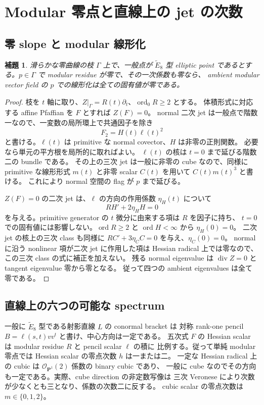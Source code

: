 \documentclass[11pt,a4paper]{ltjsarticle}
\newcommand{\PP}{\mathbf P}\renewcommand{\AA}{\mathbf A}
\newcommand{\OO}{\mathcal O}\newcommand{\FF}{\mathcal F}
\newtheorem{lemma}[theorem]{補題}
\theoremstyle{remark}\newtheorem{remark}[theorem]{注意}
\begin{document}
\section{Modular 零点と直線上の jet の次数}

\subsection{零 slope と modular 線形化}

\begin{lemma}\label{lem:zero-slope-nilpotent}
滑らかな零曲線の枝 $\Gamma$ 上で、一般点が $\widetilde E_8$ 型 elliptic point
であるとする。$p\in\Gamma$ で modular residue が零で、その一次係数も零なら、
ambient modular vector field の $p$ での線形化は全ての固有値が零である。
\end{lemma}

\begin{proof}
枝を $t$ 軸に取り、$Z|_\Gamma=R(t)\partial_t$、$\operatorname{ord}_0R\ge2$ とする。
体積形式に対応する affine Pfaffian を $F$ とすれば $Z(F)=0$。
normal 二次 jet は一般点で階数一なので、一変数の局所環上で共通因子を除き
\[
 F_2=H(t)\ell(t)^2
\]
と書ける。$\ell(t)$ は primitive な normal covector、$H$ は非零の正則関数。
必要なら単元の平方根を局所的に取ればよい。
$\ell(t)$ の核は $t=0$ まで延びる階数二の bundle である。
その上の三次 jet は一般に非零の cube なので、同様に primitive な線形形式
$m(t)$ と非零 scalar $C(t)$ を用いて $C(t)m(t)^3$ と書ける。
これにより normal 空間の flag が $p$ まで延びる。

$Z(F)=0$ の二次 jet は、$\ell$ の方向の作用係数 $\eta_H(t)$ について
\[
 RH'+2\eta_H H=0
\]
を与える。primitive generator の $t$ 微分に由来する項は $R$ を因子に持ち、
$t=0$ での固有値には影響しない。$\operatorname{ord}R\ge2$ と
$\operatorname{ord}H<\infty$ から $\eta_H(0)=0$。
二次 jet の核上の三次 class も同様に
$RC'+3\eta_C C=0$ を与え、$\eta_C(0)=0$。
normal に沿う nonlinear 項が二次 jet に作用した項は Hessian radical 上では零なので、
この三次 class の式に補正を加えない。
残る normal eigenvalue は $\operatorname{div}Z=0$ と tangent eigenvalue 零から零となる。
従って四つの ambient eigenvalues は全て零である。
\end{proof}

\subsection{直線上の六つの可能な spectrum}

一般に $\widetilde E_8$ 型である射影直線 $L$ の conormal bracket は
対称 rank-one pencil $B=\ell(s,t)vv^t$ と書け、中心方向は一定である。
五次式 $F$ の Hessian scalar は modular residue $R$ と pencil scalar $\ell$ の積に
比例する。従って単純 modular 零点では Hessian scalar の零点次数 $h$ は一または二。
一定な Hessian radical 上の cubic は $\OO_{\PP^1}(2)$ 係数の binary cubic であり、
一般に cube なのでその方向も一定である。実際、cube direction の非定数写像は
三次 Veronese により次数が少なくとも三となり、係数の次数二に反する。
cubic scalar の零点次数は $m\in\{0,1,2\}$。
\end{document}

